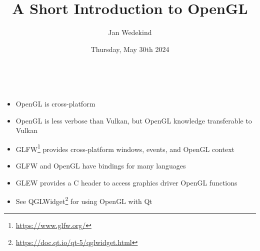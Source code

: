 \documentclass[calcdimensions,landscape,letterpaper]{powersem}
\title{A Short Introduction to OpenGL}
\author{Jan Wedekind}
\date{Thursday, May 30th 2024}
\newcommand{\thecurrentheading}{}
\newcommand{\heading}[1]{\renewcommand{\thecurrentheading}{#1}}
\begin{document}
\begin{slide}
  \heading{\ }
  \begin{center}
    \maketitle
  \end{center}
\end{slide}

\begin{slide}
  \heading{Motivation}
  \begin{center}
    \bigskip\\
    \begin{minipage}[c]{.95\textwidth}
      \begin{itemize}
          \item OpenGL is cross-platform
          \item OpenGL is less verbose than Vulkan, but OpenGL knowledge transferable to Vulkan
          \item GLFW\footnote{\url{https://www.glfw.org/}} provides cross-platform windows, events, and OpenGL context
          \item GLFW and OpenGL have bindings for many languages
          \item GLEW provides a C header to access graphics driver OpenGL functions
          \item See QGLWidget\footnote{\url{https://doc.qt.io/qt-5/qglwidget.html}} for using OpenGL with Qt
      \end{itemize}
    \end{minipage}
  \end{center}
\end{slide}
\end{document}
